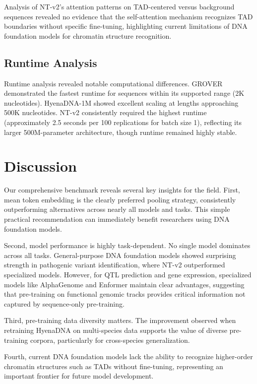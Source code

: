 \documentclass[11pt]{article}
\begin{document}
Analysis of NT-v2's attention patterns on TAD-centered versus background sequences revealed no evidence that the self-attention mechanism recognizes TAD boundaries without specific fine-tuning, highlighting current limitations of DNA foundation models for chromatin structure recognition.

\subsection{Runtime Analysis}

Runtime analysis revealed notable computational differences. GROVER demonstrated the fastest runtime for sequences within its supported range (2K nucleotides). HyenaDNA-1M showed excellent scaling at lengths approaching 500K nucleotides. NT-v2 consistently required the highest runtime (approximately 2.5 seconds per 100 replications for batch size 1), reflecting its larger 500M-parameter architecture, though runtime remained highly stable.

\section{Discussion}

Our comprehensive benchmark reveals several key insights for the field. First, mean token embedding is the clearly preferred pooling strategy, consistently outperforming alternatives across nearly all models and tasks. This simple practical recommendation can immediately benefit researchers using DNA foundation models.

Second, model performance is highly task-dependent. No single model dominates across all tasks. General-purpose DNA foundation models showed surprising strength in pathogenic variant identification, where NT-v2 outperformed specialized models. However, for QTL prediction and gene expression, specialized models like AlphaGenome and Enformer maintain clear advantages, suggesting that pre-training on functional genomic tracks provides critical information not captured by sequence-only pre-training.

Third, pre-training data diversity matters. The improvement observed when retraining HyenaDNA on multi-species data supports the value of diverse pre-training corpora, particularly for cross-species generalization.

Fourth, current DNA foundation models lack the ability to recognize higher-order chromatin structures such as TADs without fine-tuning, representing an important frontier for future model development.
\end{document}
